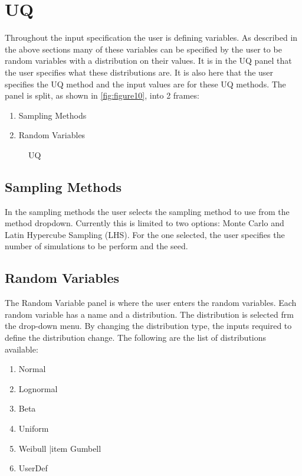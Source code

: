 \section{UQ}
Throughout the input specification the user is defining variables. As described in the above sections many of these variables can be specified by the user to be random variables with a distribution on their values. It is in the UQ panel that the user specifies what these distributions are. 
It is also here that the user specifies the UQ method and the input values are for these UQ methods. 
The panel is split,  as shown in \autoref{fig:figure10}, into 2 frames:
 \begin{enumerate}
\item Sampling Methods 
\item Random Variables
\end{enumerate}

\begin{figure}[!htbp]
  \caption{UQ}
  \label{fig:figure10}
\end{figure}


\subsection{Sampling Methods}
In the sampling methods the user selects the sampling method to use from the method dropdown. Currently this is limited to two options: 
Monte Carlo and Latin Hypercube Sampling (LHS). For the one selected, the user specifies the number of simulations to be perform and the seed.

\subsection{Random Variables}
The Random Variable panel is where the user enters the random variables. Each random variable has a name and a distribution. The distribution is selected frm the drop-down menu. By changing the distribution type, the inputs required to define the distribution change. The following are the list of distributions available:
\begin{enumerate}
\item Normal
\item Lognormal
\item Beta
\item Uniform
\item Weibull
|item Gumbell
\item UserDef
\end{enumerate} 

